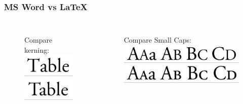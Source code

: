 \documentclass{beamer}
\begin{document}
\begin{frame}
\frametitle{MS Word vs \LaTeX}


\begin{columns}

\column[t]{4cm}

\begin{figure}[h]

\begin{center}
\large Compare kerning: \\
\medskip
\pause
  \centering
	\includegraphics[scale=0.70,clip=true]{figs/kerning_word.jpg} \\
	\bigskip
	\includegraphics[scale=0.70,clip=true]{figs/kerning_latex.jpg} \\
\end{center}
\end{figure}


\column[t]{5cm}

	\pause

\begin{figure}[h]

\begin{center}
\large Compare Small Caps: \\
\medskip
\pause
  \centering
	\includegraphics[scale=0.5,clip=true]{figs/sc_word.jpg} \\
	\bigskip
	\includegraphics[scale=0.5,clip=true]{figs/sc_latex.jpg} \\

\end{center}
\end{figure}

\end{columns}


\end{frame}
\end{document}
